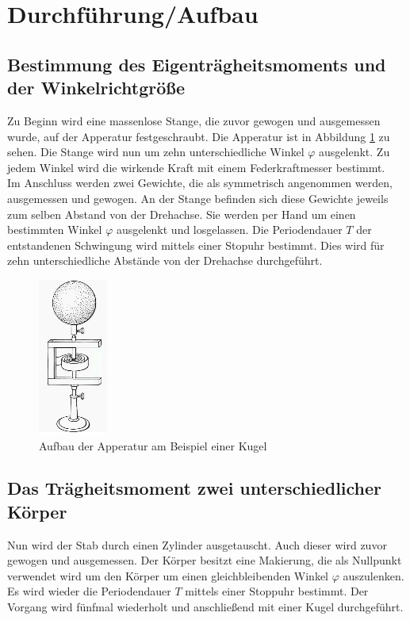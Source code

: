 \section{Durchführung/Aufbau}
\label{sec.Durchführung}

   \subsection{Bestimmung des Eigenträgheitsmoments und der Winkelrichtgröße}

   Zu Beginn wird eine massenlose Stange,
   die zuvor gewogen und ausgemessen wurde,
   auf der Apperatur festgeschraubt.
   Die Apperatur ist in Abbildung \ref{fig:1} zu sehen.
   Die Stange wird nun um zehn unterschiedliche Winkel $\varphi$ ausgelenkt.
   Zu jedem Winkel wird die wirkende Kraft mit einem Federkraftmesser bestimmt.
   \\
   Im Anschluss werden zwei Gewichte, die als symmetrisch angenommen werden,
   ausgemessen und gewogen.
   An der Stange befinden sich diese Gewichte jeweils zum selben Abstand von der Drehachse.
   Sie werden per Hand um einen bestimmten Winkel $\varphi$ ausgelenkt und losgelassen.
   Die Periodendauer $T$ der entstandenen Schwingung wird mittels einer Stopuhr bestimmt.
   Dies wird für zehn unterschiedliche Abstände von der Drehachse durchgeführt.

   \begin{figure}
    \centering
    \includegraphics[scale=0.8]{V101_Aufbau.png}
    \caption{Aufbau der Apperatur am Beispiel einer Kugel}
    \label{fig:1}
   \end{figure}

   \subsection{Das Trägheitsmoment zwei unterschiedlicher Körper}

      Nun wird der Stab durch einen Zylinder ausgetauscht.
      Auch dieser wird zuvor gewogen und ausgemessen.
      Der Körper besitzt eine Makierung, die als Nullpunkt verwendet wird
      um den Körper um einen
      gleichbleibenden Winkel $\varphi$ auszulenken.
      Es wird wieder die Periodendauer $T$ mittels einer Stoppuhr bestimmt.
      Der Vorgang wird fünfmal wiederholt und
      anschließend mit einer Kugel durchgeführt.

